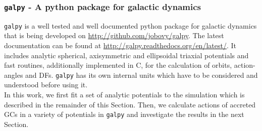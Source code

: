 \subsubsection{\texttt{galpy} - A python package for galactic dynamics}\label{subsubsec:galpy}
\texttt{galpy} \citep{Bovy...galpy...2015} is a well tested and well documented python package for galactic dynamics that is being developed on \url{http://github.com/jobovy/galpy}. The latest documentation can be found at \url{http://galpy.readthedocs.org/en/latest/}. It includes analytic spherical, axisymmetric and ellipsoidal triaxial potentials and fast routines, additionally implemented in C, for the calculation of orbits, action-angles and \acp{DF}. \texttt{galpy} has its own internal units which have to be considered and understood before using it.
\\In this work, we first fit a set of analytic potentials to the simulation which is described in the remainder of this Section. Then, we calculate actions of accreted \acp{GC} in a variety of potentials in \texttt{galpy} and investigate the results in the next Section. 

